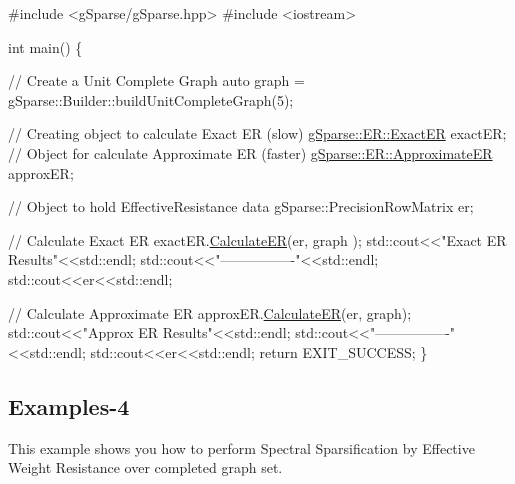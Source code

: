 \begin{DoxyCode}
\textcolor{preprocessor}{#include <gSparse/gSparse.hpp>}
\textcolor{preprocessor}{#include <iostream>}

\textcolor{keywordtype}{int} main()
\{

    \textcolor{comment}{// Create a Unit Complete Graph}
    \textcolor{keyword}{auto} graph = gSparse::Builder::buildUnitCompleteGraph(5);

    \textcolor{comment}{// Creating object to calculate Exact ER (slow)}
    \mbox{\hyperlink{classg_sparse_1_1_e_r_1_1___exact_e_r}{gSparse::ER::ExactER}} exactER;
    \textcolor{comment}{// Object for calculate Approximate ER (faster)}
    \mbox{\hyperlink{classg_sparse_1_1_e_r_1_1___approximate_e_r}{gSparse::ER::ApproximateER}} approxER; 

    \textcolor{comment}{// Object to hold EffectiveResistance data}
    gSparse::PrecisionRowMatrix er;

    \textcolor{comment}{// Calculate Exact ER}
    exactER.\mbox{\hyperlink{classg_sparse_1_1_e_r_1_1___exact_e_r_a47b950a81c815626a9d51a6284d1d49d}{CalculateER}}(er, graph );
    std::cout<<\textcolor{stringliteral}{"Exact ER Results"}<<std::endl;
    std::cout<<\textcolor{stringliteral}{"----------------"}<<std::endl;
    std::cout<<er<<std::endl;

    \textcolor{comment}{// Calculate Approximate ER}
    approxER.\mbox{\hyperlink{classg_sparse_1_1_e_r_1_1___approximate_e_r_abf16cea687d1129e1a13b4af0db44892}{CalculateER}}(er, graph);
    std::cout<<\textcolor{stringliteral}{"Approx ER Results"}<<std::endl;
    std::cout<<\textcolor{stringliteral}{"----------------"}<<std::endl;
    std::cout<<er<<std::endl;
    \textcolor{keywordflow}{return} EXIT\_SUCCESS;
\}
\end{DoxyCode}


\subsection*{Examples-\/4}

This example shows you how to perform Spectral Sparsification by Effective Weight Resistance over completed graph set.


